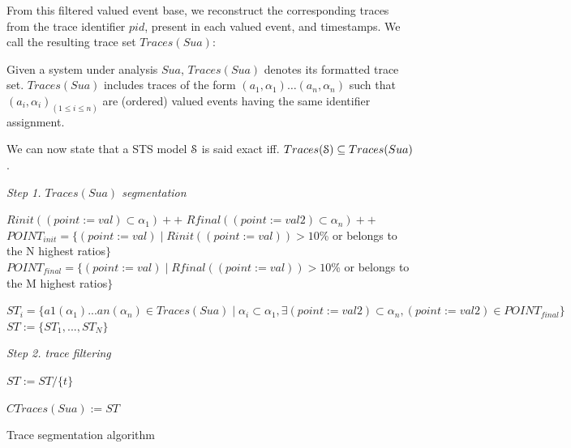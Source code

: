 From this filtered valued event base, we reconstruct the
corresponding traces from the trace identifier $pid$, present in
each valued event, and timestamps. We call the resulting trace
set $Traces(Sua)$:

\begin{definition}
    Given a system under analysis $Sua$, $Traces(Sua)$ denotes
    its formatted trace set. $Traces(Sua)$ includes traces of the
    form $(a_1,\alpha_1) \dots (a_n,\alpha_n)$ such that
    $(a_i,\alpha_i)_{(1 \leq i \leq n)}$ are (ordered) valued
    events having the same identifier assignment.

	\label{def:structuredtrace}
\end{definition}

We can now state that a STS model $\EuScript{S}$ is said exact
iff. $Traces(\EuScript{S}) \subseteq Traces(Sua)$.

\begin{algorithm}


\BlankLine
\emph{Step 1. $Traces(Sua)$ segmentation}

 {
$Rinit((point:=val)\subset \alpha_1)++$\;
$Rfinal((point:=val2)\subset \alpha_n)++$\;
}
$POINT_{init}=\{(point:=val) \mid Rinit((point:=val))>10$\% or belongs to the N highest ratios$\}$\;
$POINT_{final}=\{(point:=val) \mid Rfinal((point:=val))>10$\% or belongs to the M highest ratios$\}$\;
\BlankLine

 {
	$ST_i=\{a1(\alpha_1)...an(\alpha_n)\in Traces(Sua) \mid \alpha_i\subset \alpha_1, \exists (point:=val2)\subset \alpha_n, (point:=val2)\in POINT_{final}    \}$\;
}
$ST:=\{ST_1,...,ST_N\}$\;

\BlankLine
\emph{Step 2. trace filtering}

 {
	{
		$ST:= ST/ \{  t \}$\;
	}


	}

    $CTraces(Sua) := ST$

\caption{Trace segmentation algorithm}
\label{algo_traces}
\end{algorithm}

